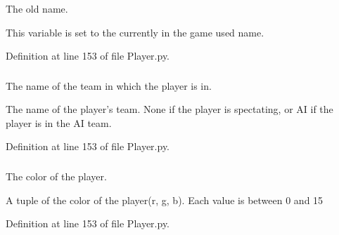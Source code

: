 \-The old name. 

\-This variable is set to the currently in the game used name. 

\-Definition at line 153 of file \-Player.\-py.

\hypertarget{class_player_1_1_player_ae34308b0c9afe7940cf09f8b29bc5c0f}{
\subsubsection[{\-\_\-\-\_\-team}]{}}
\label{class_player_1_1_player_ae34308b0c9afe7940cf09f8b29bc5c0f}


\-The name of the team in which the player is in. 

\-The name of the player's team. \-None if the player is spectating, or \-A\-I if the player is in the \-A\-I team. 

\-Definition at line 153 of file \-Player.\-py.

\hypertarget{class_player_1_1_player_ac6ebe6e06b9e99a15910f132592d5c10}{
\subsubsection[{color}]{}}
\label{class_player_1_1_player_ac6ebe6e06b9e99a15910f132592d5c10}


\-The color of the player. 

\-A tuple of the color of the player(r, g, b). \-Each value is between 0 and 15 

\-Definition at line 153 of file \-Player.\-py.

\hypertarget{class_player_1_1_player_a572e6be58205a9b53a68ad317d64c2e7}{
\subsubsection[{data}]{}}
\label{class_player_1_1_player_a572e6be58205a9b53a68ad317d64c2e7}


